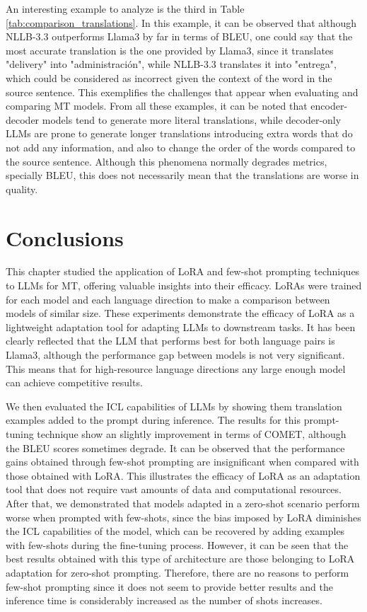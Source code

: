 \documentclass[11pt,english,listoffigures,listoftables]{tfgetsinf}
\begin{document}
An interesting example to analyze is the third in Table \ref{tab:comparison_translations}. In this example, it can be observed that although NLLB-3.3 outperforms Llama3 by far in terms of BLEU, one could say that the most accurate translation is the one provided by Llama3, since it translates "delivery" into "administración", while NLLB-3.3 translates it into "entrega", which could be considered as incorrect given the context of the word in the source sentence. This exemplifies the challenges that appear when evaluating and comparing MT models. From all these examples, it can be noted that encoder-decoder models tend to generate more literal translations, while decoder-only LLMs are prone to generate longer translations introducing extra words that do not add any information, and also to change the order of the words compared to the source sentence. Although this phenomena normally degrades metrics, specially BLEU, this does not necessarily mean that the translations are worse in quality.

\section{Conclusions}

This chapter studied the application of LoRA and few-shot prompting techniques to LLMs for MT, offering valuable insights into their efficacy. LoRAs were trained for each model and each language direction to make a comparison between models of similar size. These experiments demonstrate the efficacy of LoRA as a lightweight adaptation tool for adapting LLMs to downstream tasks. It has been clearly reflected that the LLM that performs best for both language pairs is Llama3, although the performance gap between models is not very significant. This means that for high-resource language directions any large enough model can achieve competitive results. 

We then evaluated the ICL capabilities of LLMs by showing them translation examples added to the prompt during inference. The results for this prompt-tuning technique show an slightly improvement in terms of COMET, although the BLEU scores sometimes degrade. It can be observed that the performance gains obtained through few-shot prompting are insignificant when compared with those obtained with LoRA. This illustrates the efficacy of LoRA as an adaptation tool that does not require vast amounts of data and computational resources. After that, we demonstrated that models adapted in a zero-shot scenario perform worse when prompted with few-shots, since the bias imposed by LoRA diminishes the ICL capabilities of the model, which can be recovered by adding examples with few-shots during the fine-tuning process. However, it can be seen that the best results obtained with this type of architecture are those belonging to LoRA adaptation for zero-shot prompting. Therefore, there are no reasons to perform few-shot prompting since it does not seem to provide better results and the inference time is considerably increased as the number of shots increases.
\end{document}
